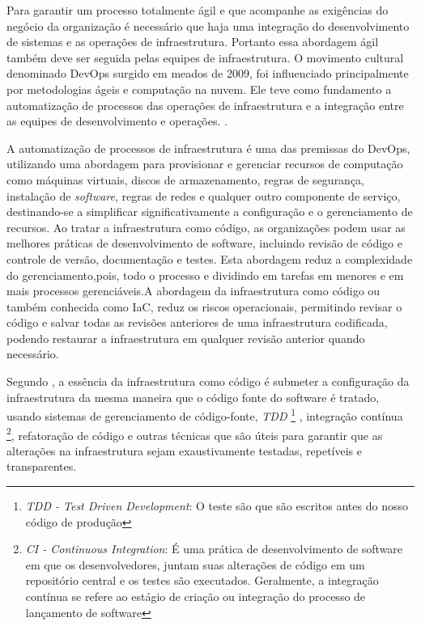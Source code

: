 Para garantir um processo totalmente ágil e que acompanhe as exigências do negócio da organização é necessário que haja uma integração do desenvolvimento de sistemas e as operações de infraestrutura. Portanto essa abordagem ágil também deve ser seguida pelas equipes de infraestrutura.
O movimento cultural denominado DevOps surgido em meados de 2009, foi influenciado principalmente por metodologias ágeis e computação na nuvem. Ele teve como fundamento a automatização de processos das operações de infraestrutura e a integração entre as equipes de desenvolvimento e operações. \cite{sato}.

A automatização de processos de infraestrutura é uma das premissas do DevOps, utilizando uma abordagem para provisionar e gerenciar recursos de computação como máquinas virtuais, discos de armazenamento, regras de segurança, instalação de \textit{software}, regras de redes e qualquer outro componente de serviço, destinando-se a simplificar significativamente a configuração e o gerenciamento de recursos. Ao tratar a infraestrutura como código, as organizações podem usar as melhores práticas de desenvolvimento de software, incluindo revisão de código e controle de versão, documentação e testes. Esta abordagem reduz a complexidade do gerenciamento,pois, todo o processo e dividindo em tarefas em menores e em mais processos gerenciáveis.A abordagem da infraestrutura como código ou também conhecida como IaC, reduz os riscos operacionais, permitindo revisar o código e salvar todas as revisões anteriores de uma infraestrutura codificada, podendo restaurar a infraestrutura em qualquer revisão anterior quando necessário.

Segundo , a essência da infraestrutura como código é submeter a configuração da infraestrutura da mesma maneira que o código fonte do software é tratado, usando sistemas de gerenciamento de código-fonte, \textit{TDD} \footnote{\textit{TDD - Test Driven Development}: O teste são que são escritos antes do nosso código de produção} , integração contínua \footnote{\textit{CI - Continuous Integration}: É uma prática de desenvolvimento de software em que os desenvolvedores, juntam suas alterações de código em um repositório central e os testes são executados. Geralmente, a integração contínua se refere ao estágio de criação ou integração do processo de lançamento de software  }, refatoração de código e outras técnicas que são úteis para garantir que as alterações na infraestrutura sejam exaustivamente testadas, repetíveis e transparentes.


